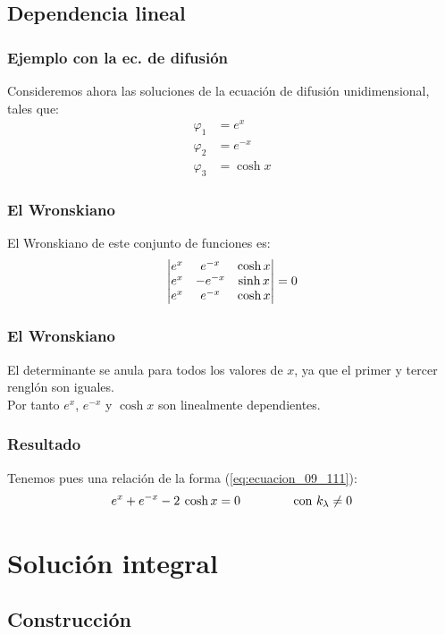 \documentclass[12pt]{beamer}
\begin{document}
\subsection{Dependencia lineal}

\begin{frame}
\frametitle{Ejemplo con la ec. de difusión}
Consideremos ahora las soluciones de la ecuación de difusión unidimensional, tales que:
\pause
\begin{align*}
\varphi_{1} &= e^{x} \\[0.5em]
\varphi_{2} &= e^{-x} \\[0.5em]
\varphi_{3} &= \cosh x
\end{align*}
\end{frame}
\begin{frame}
\frametitle{El Wronskiano}
El Wronskiano de este conjunto de funciones es:
\pause
\begin{align*}
\mdet{
e^{x}  & e^{-x} & \cosh x \\
e^{x}  & -e^{-x} & \sinh x \\
e^{x}  & e^{-x} & \cosh x
} = 0
\end{align*}
\end{frame}
\begin{frame}
\frametitle{El Wronskiano}
El determinante se anula para todos los valores de $x$, ya que el primer y tercer renglón son iguales.
\\
\bigskip
\pause
Por tanto $e^{x}$, $e^{-x}$ y $\cosh x$ son linealmente dependientes.
\end{frame}
\begin{frame}
\frametitle{Resultado}
Tenemos pues una relación de la forma (\ref{eq:ecuacion_09_111}):
\begin{align*}
e^{x} + e^{-x} - 2 \: \cosh x = 0 \hspace{1.5cm} \text{con } k_{\lambda} \neq 0
\end{align*}
\end{frame}

\section{Solución integral}
\subsection{Construcción}
\end{document}
